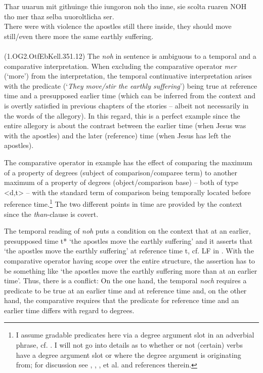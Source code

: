 \documentclass[output=paper
,modfonts
,nonflat]{langsci/langscibook}
\begin{document}
\ea\gll Thar uuarun mit githuinge thie iungoron noh tho inne, sie scolta ruaren NOH tho mer thaz selba uuoroltlicha ser.\\
       There were with violence the apostles still there inside, they should move still/even there more the same earthly suffering.\\
\label{OG2_noch_mehr_ruehren} \\ (1.OG2.OtfEbKell.351.12)
\z
The \textit{noh} in sentence  is ambiguous to a temporal and a comparative interpretation. When excluding the comparative operator \textit{mer} (`more') from the interpretation, the temporal continuative interpretation arises with the predicate (`\textit{They move/stir the earthly suffering}') being true at reference time and a presupposed earlier time (which can be inferred from the context and is overtly satisfied in previous chapters of the stories -- albeit not necessarily in the words of the allegory). In this regard, this is a perfect example since the entire allegory is about the contrast between the earlier time (when Jesus was with the apostles) and the later (reference) time (when Jesus has left the apostles). 

The comparative operator in example  has the effect of comparing the maximum of a property of degrees (subject of comparison/comparee term) to another maximum of a property of degrees (object/comparison base) -- both of type <d,t> -- with the standard term of comparison being temporally located before reference time.\footnote{ I assume gradable predicates here via a degree argument slot in an adverbial phrase, cf. . I will not go into details as to whether or not (certain) verbs have a degree argument slot or where the degree argument is originating from; for discussion see \citeauthor{pinon2008} \citeyearpar{pinon2008}, \citeauthor{rett2013} \citeyearpar{rett2013}, \citeauthor{kennedy_mcnally2005} \citeyearpar{kennedy_mcnally2005}, \citeauthor{kennedy2012} \citeyearpar{kennedy2012} et al. and references therein.} The two different points in time are provided by the context since the \textit{than}-clause is covert.

The temporal reading of \textit{noh} puts a condition on the context that at an earlier, presupposed time t* `the apostles move the earthly suffering' and it asserts that `the apostles move the earthly suffering' at reference time t, cf. LF in  \citep[cf. also][]{beck2016a_sub}. With the comparative operator having scope over the entire structure, the assertion has to be something like `the apostles move the earthly suffering more than at an earlier time'. Thus, there is a conflict: On the one hand, the temporal \textit{noch} requires a predicate to be true at an earlier time and at reference time and, on the other hand, the comparative requires that the predicate for reference time and an earlier time differs with regard to degrees.
\end{document}
